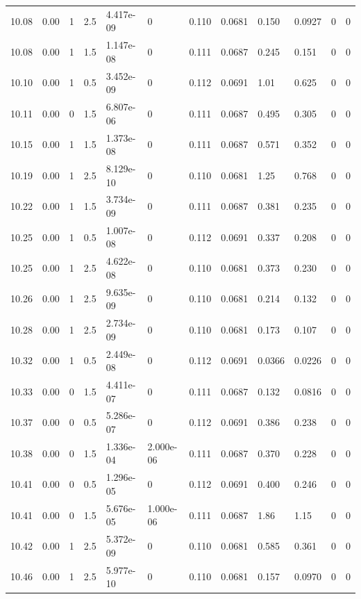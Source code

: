 \documentclass[preview]{standalone}
\begin{document}
{{{{{{\begin{tabular}{L{1.2cm}C{1.2cm} C{0.3cm}C{0.5cm} C{1.4cm}C{1.4cm} C{1.4cm}C{1.4cm} C{1.6cm}C{1.6cm} C{1.6cm}C{1.6cm}}
  10.08  &  0.00  & 1     & 2.5 &  4.417e-09  & 0  &  0.110&   0.0681& 0.150 & 0.0927   &  0 & 0  \\ 
  10.08  &  0.00  & 1     & 1.5 &  1.147e-08  & 0  &  0.111&   0.0687& 0.245 & 0.151   &  0 & 0  \\ 
  10.10  &  0.00  & 1     & 0.5 &  3.452e-09  & 0  &  0.112&   0.0691& 1.01 & 0.625   &  0 & 0  \\ 
  10.11  &  0.00  & 0     & 1.5 &  6.807e-06  & 0  &  0.111&   0.0687& 0.495 & 0.305   &  0 & 0  \\ 
  10.15  &  0.00  & 1     & 1.5 &  1.373e-08  & 0  &  0.111&   0.0687& 0.571 & 0.352   &  0 & 0  \\ 
  10.19  &  0.00  & 1     & 2.5 &  8.129e-10  & 0  &  0.110&   0.0681& 1.25 & 0.768   &  0 & 0  \\ 
  10.22  &  0.00  & 1     & 1.5 &  3.734e-09  & 0  &  0.111&   0.0687& 0.381 & 0.235   &  0 & 0  \\ 
  10.25  &  0.00  & 1     & 0.5 &  1.007e-08  & 0  &  0.112&   0.0691& 0.337 & 0.208   &  0 & 0  \\ 
  10.25  &  0.00  & 1     & 2.5 &  4.622e-08  & 0  &  0.110&   0.0681& 0.373 & 0.230   &  0 & 0  \\ 
  10.26  &  0.00  & 1     & 2.5 &  9.635e-09  & 0  &  0.110&   0.0681& 0.214 & 0.132   &  0 & 0  \\ 
  10.28  &  0.00  & 1     & 2.5 &  2.734e-09  & 0  &  0.110&   0.0681& 0.173 & 0.107   &  0 & 0  \\ 
  10.32  &  0.00  & 1     & 0.5 &  2.449e-08  & 0  &  0.112&   0.0691& 0.0366 & 0.0226   &  0 & 0  \\ 
  10.33  &  0.00  & 0     & 1.5 &  4.411e-07  & 0  &  0.111&   0.0687& 0.132 & 0.0816   &  0 & 0  \\ 
  10.37  &  0.00  & 0     & 0.5 &  5.286e-07  & 0  &  0.112&   0.0691& 0.386 & 0.238   &  0 & 0  \\ 
  10.38  &  0.00  & 0     & 1.5 &  1.336e-04  & 2.000e-06  &  0.111&   0.0687& 0.370 & 0.228   &  0 & 0  \\ 
  10.41  &  0.00  & 0     & 0.5 &  1.296e-05  & 0  &  0.112&   0.0691& 0.400 & 0.246   &  0 & 0  \\ 
  10.41  &  0.00  & 0     & 1.5 &  5.676e-05  & 1.000e-06  &  0.111&   0.0687& 1.86 & 1.15   &  0 & 0  \\ 
  10.42  &  0.00  & 1     & 2.5 &  5.372e-09  & 0  &  0.110&   0.0681& 0.585 & 0.361   &  0 & 0  \\ 
  10.46  &  0.00  & 1     & 2.5 &  5.977e-10  & 0  &  0.110&   0.0681& 0.157 & 0.0970   &  0 & 0  \\ 

\end{tabular}}}}}}}
\end{document}
